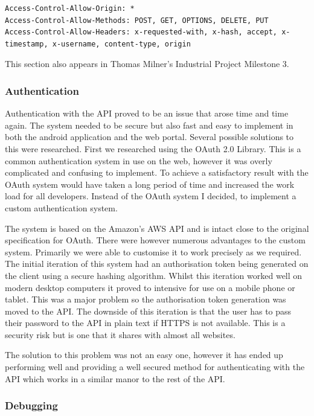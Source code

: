 \documentclass[11pt,a4paper]{report}
\begin{document}
\begin{lstlisting}[captionpos=b, caption=The CORS headers, label=lst:corsheaders]
Access-Control-Allow-Origin: *
Access-Control-Allow-Methods: POST, GET, OPTIONS, DELETE, PUT
Access-Control-Allow-Headers: x-requested-with, x-hash, accept, x-timestamp, x-username, content-type, origin
\end{lstlisting}

This section also appears in Thomas Milner's Industrial Project Milestone 3. 

\subsubsection{Authentication}

Authentication with the API proved to be an issue that arose time and time again. The system needed to be secure but also fast and easy to implement in both the android application and the web portal. Several possible solutions to this were researched. First we researched using the OAuth 2.0 Library. This is a common authentication system in use on the web, however it was overly complicated and confusing to implement. To achieve a satisfactory result with the OAuth system would have taken a long period of time and increased the work load for all developers. Instead of the OAuth system I decided, to implement a custom authentication system. 

The system is based on the Amazon's AWS API and is intact close to the original specification for OAuth. There were however numerous advantages to the custom system. Primarily we were able to customise it to work precisely as we required. The initial iteration of this system had an authorisation token being generated on the client using a secure hashing algorithm. Whilst this iteration worked well on modern desktop computers it proved to intensive for use on a mobile phone or tablet. This was a major problem so the authorisation token generation was moved to the API. The downside of this iteration is that the user has to pass their password to the API in plain text if HTTPS is not available. This is a security risk but is one that it shares with almost all websites. 

The solution to this problem was not an easy one, however it has ended up performing well and providing a well secured method for authenticating with the API which works in a similar manor to the rest of the API. 

\subsubsection{Debugging} 
\end{document}
